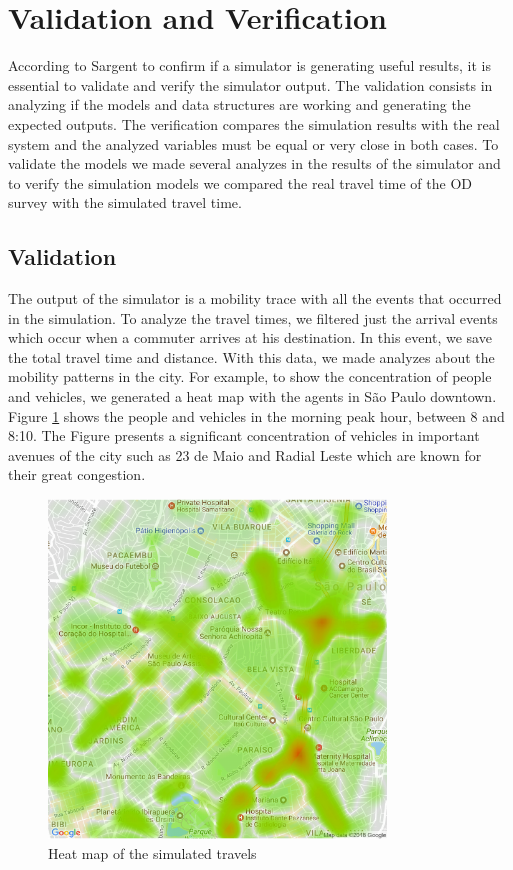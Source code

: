 \section{Validation and Verification}

According to Sargent \cite{sargent2013verification} to confirm if a simulator is generating useful results, it is essential to validate and verify the simulator output. The validation consists in analyzing if the models and data structures are working and generating the expected outputs. The verification compares the simulation results with the real system and the analyzed variables must be equal or very close in both cases. To validate the models we made several analyzes in the results of the simulator and to verify the simulation models we compared the real travel time of the OD survey with the simulated travel time. 

\subsection{Validation}

The output of the simulator is a mobility trace with all the events that occurred in the simulation. To analyze the travel times, we filtered just the arrival events which occur when a commuter arrives at his destination. In this event, we save the total travel time and distance. With this data, we made analyzes about the mobility patterns in the city. For example, to show the concentration of people and vehicles, we generated a heat map with the agents in S\~ao Paulo downtown. Figure \ref{fig:heat_map} shows the people and vehicles in the morning peak hour, between 8 and 8:10. The Figure presents a significant concentration of vehicles in important avenues of the city such as 23 de Maio and Radial Leste which are known for their great congestion.

\begin{figure}[!htb]
\centering
\includegraphics[width=0.8\textwidth]{figuras/chap-sp/mapa_calor.pdf}
\caption{Heat map of the simulated travels}
\label{fig:heat_map}
\end{figure}

